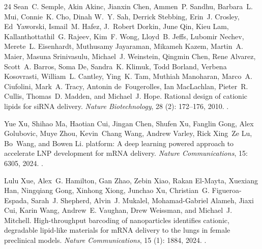 \documentclass{article}
\begin{document}
\begin{thebibliography}{24}
Sean~C. Semple, Akin Akinc, Jianxin Chen, Ammen~P. Sandhu, Barbara~L. Mui,
  Connie~K. Cho, Dinah W.~Y. Sah, Derrick Stebbing, Erin~J. Crosley,
  Ed~Yaworski, Ismail~M. Hafez, J.~Robert Dorkin, June Qin, Kieu Lam,
  Kallanthottathil~G. Rajeev, Kim~F. Wong, Lloyd~B. Jeffs, Lubomir Nechev,
  Merete~L. Eisenhardt, Muthusamy Jayaraman, Mikameh Kazem, Martin~A. Maier,
  Masuna Srinivasulu, Michael~J. Weinstein, Qingmin Chen, Rene Alvarez,
  Scott~A. Barros, Soma De, Sandra~K. Klimuk, Todd Borland, Verbena Kosovrasti,
  William~L. Cantley, Ying~K. Tam, Muthiah Manoharan, Marco~A. Ciufolini,
  Mark~A. Tracy, Antonin de~Fougerolles, Ian MacLachlan, Pieter~R. Cullis,
  Thomas~D. Madden, and Michael~J. Hope.
\newblock Rational design of cationic lipids for {siRNA} delivery.
\newblock \emph{Nature Biotechnology}, 28 (2): 172--176,
  2010.
\newblock {}.

Yue Xu, Shihao Ma, Haotian Cui, Jingan Chen, Shufen Xu, Fanglin Gong, Alex
  Golubovic, Muye Zhou, Kevin~Chang Wang, Andrew Varley, Rick Xing~Ze Lu,
  Bo~Wang, and Bowen Li.
 platform: A deep learning powered approach to accelerate
  {LNP} development for {mRNA} delivery.
\newblock \emph{Nature Communications}, 15: 6305, 2024.
\newblock {}.

Lulu Xue, Alex~G. Hamilton, Gan Zhao, Zebin Xiao, Rakan El-Mayta, Xuexiang Han,
  Ningqiang Gong, Xinhong Xiong, Junchao Xu, Christian~G. Figueroa-Espada,
  Sarah~J. Shepherd, Alvin~J. Mukalel, Mohamad-Gabriel Alameh, Jiaxi Cui, Karin
  Wang, Andrew~E. Vaughan, Drew Weissman, and Michael~J. Mitchell.
\newblock High-throughput barcoding of nanoparticles identifies cationic,
  degradable lipid-like materials for {mRNA} delivery to the lungs in female
  preclinical models.
\newblock \emph{Nature Communications}, 15 (1): 1884, 2024.
\newblock {}.

\end{thebibliography}
\end{document}
